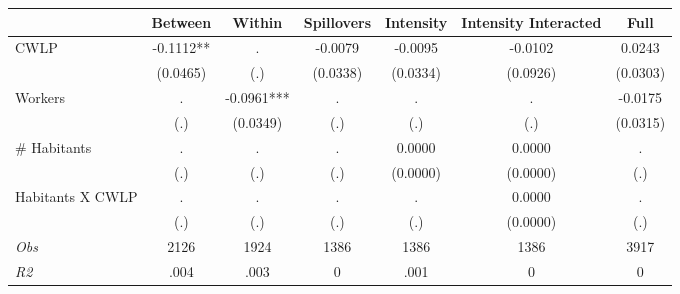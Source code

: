 \begin{tabular}{l*{6}{c}}\hline&\multicolumn{1}{c}{Between}&\multicolumn{1}{c}{Within}&\multicolumn{1}{c}{Spillovers}&\multicolumn{1}{c}{Intensity}&\multicolumn{1}{c}{Intensity Interacted}&\multicolumn{1}{c}{Full}\\ \hline 
CWLP & -0.1112** & . & -0.0079 & -0.0095 & -0.0102 & 0.0243 \\
 & (0.0465) & (.) & (0.0338) & (0.0334) & (0.0926) & (0.0303) \\
Workers & . & -0.0961*** & . & . & . & -0.0175 \\
 & (.) & (0.0349) & (.) & (.) & (.) & (0.0315) \\
\# Habitants & . & . & . & 0.0000 & 0.0000 & . \\
 & (.) & (.) & (.) & (0.0000) & (0.0000) & (.) \\
Habitants X CWLP & . & . & . & . & 0.0000 & . \\
 & (.) & (.) & (.) & (.) & (0.0000) & (.) \\
\hline \textit{Obs} & 2126 & 1924 & 1386 & 1386 & 1386 & 3917 \\ \textit{R2} & .004 & .003 & 0 & .001 & 0 & 0 \\ \hline \end{tabular}
